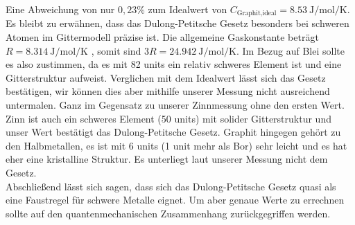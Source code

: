 Eine Abweichung von nur $0,23\%$ zum Idealwert von $C_{\text{Graphit,ideal}}=\SI{8,53}{\joule\per\mol\per\kelvin}$.\cite{wiki}\\
Es bleibt zu erwähnen, dass das Dulong-Petitsche Gesetz besonders bei schweren Atomen im Gittermodell präzise ist.
Die allgemeine Gaskonstante beträgt $R = \SI{8,314}{\joule\per\mol\per\kelvin}$ \cite{codata}, somit sind $3R = \SI{24,942}{\joule\per\mol\per\kelvin}$.
Im Bezug auf Blei sollte es also zustimmen, da es mit 82 units ein relativ schweres Element ist und eine Gitterstruktur aufweist.
Verglichen mit dem Idealwert lässt sich das Gesetz bestätigen, wir können dies aber mithilfe unserer Messung nicht ausreichend untermalen.
Ganz im Gegensatz zu unserer Zinnmessung ohne den ersten Wert.
Zinn ist auch ein schweres Element (50 units) mit solider Gitterstruktur und unser Wert bestätigt das Dulong-Petitsche Gesetz.
Graphit hingegen gehört zu den Halbmetallen, es ist mit 6 units (1 unit mehr als Bor) sehr leicht und es hat eher eine kristalline Struktur.
Es unterliegt laut unserer Messung nicht dem Gesetz.\\
Abschließend lässt sich sagen, dass sich das Dulong-Petitsche Gesetz quasi als eine Faustregel für schwere Metalle eignet.
Um aber genaue Werte zu errechnen sollte auf den quantenmechanischen Zusammenhang zurückgegriffen werden.
